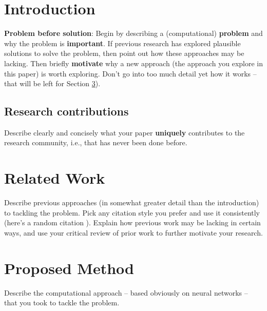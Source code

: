 \documentclass{article}
\begin{document}
\section{Introduction}
{\bf Problem before solution}:
Begin by describing a (computational) {\bf problem} and why the problem is {\bf important}. If previous research has
explored plausible solutions to solve the problem, then point out how these approaches may be lacking. Then briefly {\bf motivate}
why a new approach (the approach you explore in this paper) is worth exploring. Don't go into too much detail yet how it works -- that will
be left for Section \ref{sec:proposed_method}).

\subsection{Research contributions}
Describe clearly and concisely what your paper {\bf uniquely} contributes to the research community, i.e., that has never been done before.

\section{Related Work}
Describe previous approaches (in somewhat greater detail than the introduction) to tackling the problem. Pick any citation style you prefer and use it
consistently (here's a random citation \cite{mitchell80}). Explain how previous work may be lacking in certain ways, and use your critical review
of prior work to further motivate your research.

\section{Proposed Method}
\label{sec:proposed_method}
Describe the computational approach -- based obviously on neural networks -- that you took to tackle the problem.
\end{document}
